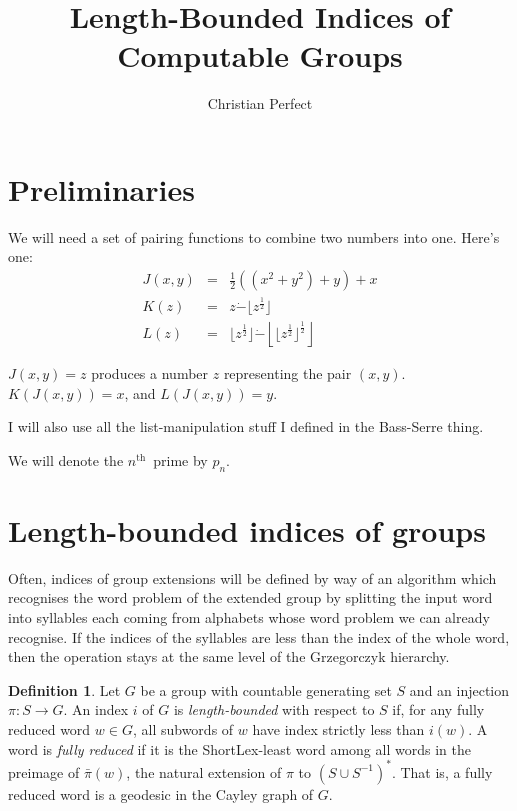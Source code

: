 \documentclass[a4paper]{article}
\newcommand{\nth}{$n^{\textrm{th}}$~}
\newcommand{\shortlex}{{\sf ShortLex}\;}
\newcommand{\psub}{\dot -}
\theoremstyle{plain}
\theoremstyle{definition}
\newtheorem{definition}[theorem]{Definition}
\begin{document}
\title{Length-Bounded Indices of Computable Groups}
\author{Christian Perfect}
\maketitle

\section{Preliminaries}
We will need a set of pairing functions to combine two numbers into one. Here's one:
\begin{eqnarray*}
	J(x,y) &=& \frac{1}{2}\left( (x^2+y^2)+y \right)+x \\
	K(z) &=& z \psub \lfloor z^{\frac{1}{2}} \rfloor \\
	L(z) &=& \lfloor z^{\frac{1}{2}} \rfloor \psub \left \lfloor \lfloor z^{\frac{1}{2}} \rfloor^{\frac{1}{2}} \right \rfloor
\end{eqnarray*}

$J(x,y) = z$ produces a number $z$ representing the pair $(x,y)$. $K(J(x,y)) = x$, and $L(J(x,y))=y$.

I will also use all the list-manipulation stuff I defined in the Bass-Serre thing.

We will denote the \nth prime by $p_n$.

\section{Length-bounded indices of groups}

Often, indices of group extensions will be defined by way of an algorithm which recognises the word problem of the extended group by splitting the input word into syllables each coming from alphabets whose word problem we can already recognise. If the indices of the syllables are less than the index of the whole word, then the operation stays at the same level of the Grzegorczyk hierarchy.

\begin{definition}
	Let $G$ be a group with countable generating set $S$ and an injection $\pi: S \rightarrow G$. An index $i$ of $G$ is {\em length-bounded} with respect to $S$ if, for any fully reduced word $w \in G$, all subwords of $w$ have index strictly less than $i(w)$. A word is {\it fully reduced} if it is the \shortlex-least word among all words in the preimage of $\bar\pi(w)$, the natural extension of $\pi$ to $(S\cup S^{-1})^*$. That is, a fully reduced word is a geodesic in the Cayley graph of $G$. 
\end{definition}
\end{document}
